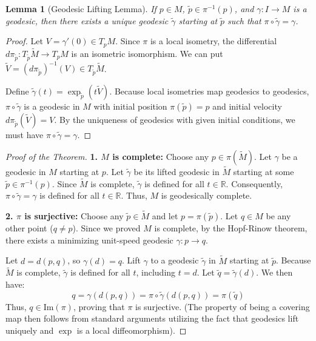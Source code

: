 \documentclass[11pt, a4paper]{article}
\theoremstyle{plain}
\newtheorem{lemma}[theorem]{Lemma}
\theoremstyle{definition}
\theoremstyle{remark}
\begin{document}
{\begin{lemma}[Geodesic Lifting Lemma]
If $p \in M$, $\tilde{p} \in \pi^{-1}(p)$, and $\gamma: I \to M$ is a geodesic, then there exists a unique geodesic $\tilde{\gamma}$ starting at $\tilde{p}$ such that $\pi \circ \tilde{\gamma} = \gamma$.
\end{lemma}

\begin{proof}
Let $V = \gamma'(0) \in T_pM$. Since $\pi$ is a local isometry, the differential $d\pi_{\tilde{p}}: T_{\tilde{p}}\tilde{M} \to T_pM$ is an isometric isomorphism. We can put $\tilde{V} = (d\pi_{\tilde{p}})^{-1}(V) \in T_{\tilde{p}}\tilde{M}$. 

Define $\tilde{\gamma}(t) = \exp_{\tilde{p}}(t\tilde{V})$. Because local isometries map geodesics to geodesics, $\pi \circ \tilde{\gamma}$ is a geodesic in $M$ with initial position $\pi(\tilde{p}) = p$ and initial velocity $d\pi_{\tilde{p}}(\tilde{V}) = V$. By the uniqueness of geodesics with given initial conditions, we must have $\pi \circ \tilde{\gamma} = \gamma$.
\end{proof}

\begin{proof}[Proof of the Theorem]
\textbf{1. $M$ is complete:} 
Choose any $p \in \pi(\tilde{M})$. Let $\gamma$ be a geodesic in $M$ starting at $p$. Let $\tilde{\gamma}$ be its lifted geodesic in $\tilde{M}$ starting at some $\tilde{p} \in \pi^{-1}(p)$. Since $\tilde{M}$ is complete, $\tilde{\gamma}$ is defined for all $t \in \mathbb{R}$. Consequently, $\pi \circ \tilde{\gamma} = \gamma$ is defined for all $t \in \mathbb{R}$. Thus, $M$ is geodesically complete.

\textbf{2. $\pi$ is surjective:}
Choose any $\tilde{p} \in \tilde{M}$ and let $p = \pi(\tilde{p})$. Let $q \in M$ be any other point ($q \neq p$). 
Since we proved $M$ is complete, by the Hopf-Rinow theorem, there exists a minimizing unit-speed geodesic $\gamma: p \to q$. 

Let $d = d(p,q)$, so $\gamma(d) = q$. Lift $\gamma$ to a geodesic $\tilde{\gamma}$ in $\tilde{M}$ starting at $\tilde{p}$. Because $\tilde{M}$ is complete, $\tilde{\gamma}$ is defined for all $t$, including $t = d$. 
Let $\tilde{q} = \tilde{\gamma}(d)$. We then have:
\[ q = \gamma(d(p,q)) = \pi \circ \tilde{\gamma}(d(p,q)) = \pi(\tilde{q}) \]
Thus, $q \in \text{Im}(\pi)$, proving that $\pi$ is surjective. 
(The property of being a covering map then follows from standard arguments utilizing the fact that geodesics lift uniquely and $\exp$ is a local diffeomorphism).
\end{proof}
}
\end{document}
